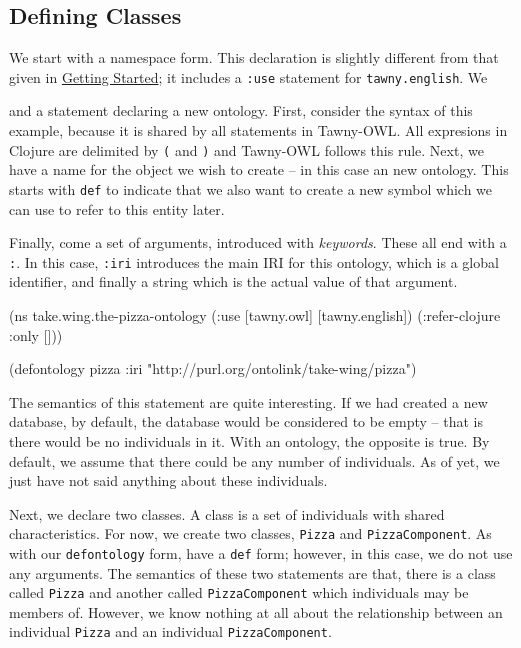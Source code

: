 \documentclass[11pt]{article}
\begin{document}
\subsection{Defining Classes}
\label{sec-5-2}

We start with a namespace form. This declaration is slightly different from
that given in \hyperref[sec-4]{Getting Started}; it includes a \verb~:use~ statement for
\verb~tawny.english~. We 



and a statement declaring a new ontology. First, consider the syntax of
this example, because it is shared by all statements in Tawny-OWL. All
expresions in Clojure are delimited by \verb~(~ and \verb~)~ and Tawny-OWL follows
this rule. Next, we have a name for the object we wish to create -- in
this case an new ontology. This starts with \verb~def~ to indicate that we
also want to create a new symbol which we can use to refer to this
entity later.

Finally, come a set of arguments, introduced with \emph{keywords}. These all
end with a \verb~:~. In this case, \verb~:iri~ introduces the main IRI for this
ontology, which is a global identifier, and finally a string which is
the actual value of that argument.

\begin{tawny}
(ns take.wing.the-pizza-ontology
  (:use [tawny.owl]
	[tawny.english])
  (:refer-clojure :only []))

(defontology pizza :iri "http://purl.org/ontolink/take-wing/pizza")
\end{tawny}


The semantics of this statement are quite interesting. If we had created
a new database, by default, the database would be considered to be empty
-- that is there would be no individuals in it. With an ontology, the
opposite is true. By default, we assume that there could be any number
of individuals. As of yet, we just have not said anything about these
individuals.

Next, we declare two classes. A class is a set of individuals with
shared characteristics. For now, we create two classes, \verb~Pizza~ and
\verb~PizzaComponent~. As with our \verb~defontology~ form, have a \verb~def~ form;
however, in this case, we do not use any arguments. The semantics of
these two statements are that, there is a class called \verb~Pizza~ and
another called \verb~PizzaComponent~ which individuals may be members of.
However, we know nothing at all about the relationship between an
individual \verb~Pizza~ and an individual \verb~PizzaComponent~.
\end{document}
